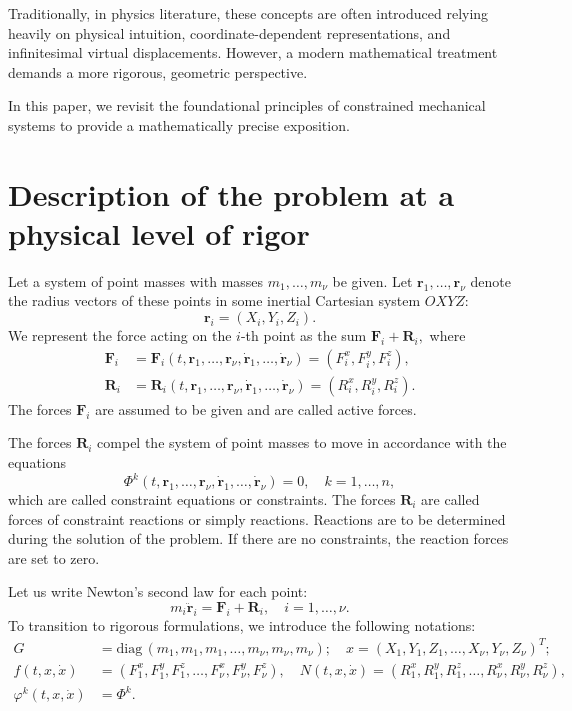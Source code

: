 \documentclass[reqno,12pt]{amsproc}
\newcommand\ph\varphi
\begin{document}
Traditionally, in physics literature, these concepts are often introduced relying heavily on physical intuition, coordinate-dependent representations, and infinitesimal virtual displacements. However, a modern mathematical treatment demands a more rigorous, geometric perspective.

In this paper, we revisit the foundational principles of constrained mechanical systems to provide a mathematically precise exposition.

\section{Description of the problem at a physical level of rigor}

Let a system of point masses with masses
$m_1,\ldots,m_\nu$ be given.
Let $\boldsymbol r_1,\ldots,\boldsymbol r_\nu$ denote the radius vectors of these points in some inertial Cartesian system $OXYZ$:
$$\boldsymbol r_i=(X_i,Y_i,Z_i).$$
We represent the force acting on the $i$-th point as the sum
$\boldsymbol F_i+\boldsymbol R_i,$ where
\begin{align}\boldsymbol F_i&=\boldsymbol F_i(t,\boldsymbol r_1,\ldots,\boldsymbol r_{\nu},\boldsymbol {\dot r}_1,\ldots,\boldsymbol {\dot r}_{\nu})=(F_i^x,F_i^y,F_i^z),\nonumber\\
 \boldsymbol R_i&=\boldsymbol R_i(t,\boldsymbol r_1,\ldots,\boldsymbol r_{\nu},\boldsymbol {\dot r}_1,\ldots,\boldsymbol {\dot r}_{\nu})=(R_i^x,R_i^y,R_i^z).\nonumber
 \end{align}
The forces $\boldsymbol F_i$ are assumed to be given and are called active forces. 

The forces $\boldsymbol R_i$ compel the system of point masses to move in accordance with the equations
$$\Phi^k(t,\boldsymbol r_1,\ldots,\boldsymbol r_{\nu},\boldsymbol {\dot r}_1,\ldots,\boldsymbol {\dot r}_{\nu})=0,\quad k=1,\ldots, n,$$ which are called constraint equations or constraints. The forces $\boldsymbol R_i$ are called forces of constraint reactions or simply reactions. Reactions are to be determined during the solution of the problem. If there are no constraints, the reaction forces are set to zero.

Let us write Newton's second law for each point:
\begin{equation}\label{dfgjjj}m_i\boldsymbol {\ddot r}_i=\boldsymbol F_i+\boldsymbol R_i,\quad i=1,\ldots, {\nu}.\end{equation}
To transition to rigorous formulations, we introduce the following notations:
\begin{align}G&=\mathrm{diag}\,(m_1,m_1,m_1,\ldots,m_{\nu},m_{\nu},m_{\nu});\quad x=(X_1,Y_1,Z_1,\ldots,X_{\nu},Y_{\nu},Z_{\nu})^T;\nonumber\\
f(t,x,\dot x)&=(F_1^x,F_1^y,F_1^z,\ldots ,F_{\nu}^x,F_{\nu}^y,F_{\nu}^z),\quad N(t,x,\dot x)=(R_1^x,R_1^y,R_1^z,\ldots ,R_{\nu}^x,R_{\nu}^y,R_{\nu}^z),\nonumber\\
\ph^k(t,x,\dot x)&=\Phi^k.\nonumber
\end{align}
\end{document}
